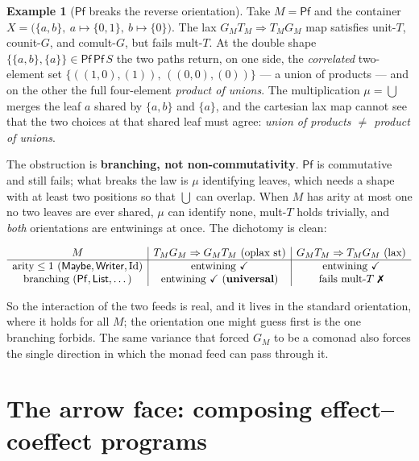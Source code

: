\documentclass[11pt]{amsart}
\theoremstyle{plain}
\theoremstyle{definition}
\newtheorem{example}[theorem]{Example}
\theoremstyle{remark}
\newcommand{\str}{\mathrm{st}}
\newcommand{\Maybe}{\mathsf{Maybe}}
\newcommand{\Pf}{\mathsf{Pf}}
\newcommand{\Writer}{\mathsf{Writer}}
\newcommand{\List}{\mathsf{List}}
\begin{document}
\begin{example}[$\Pf$ breaks the reverse orientation]\label{ex:pf-breaks}
Take $M=\Pf$ and the container $X=\bigl(\{a,b\},\ a\mapsto\{0,1\},\ b\mapsto\{0\}\bigr)$. The
lax $G_M T_M\Rightarrow T_M G_M$ map satisfies unit-$T$, counit-$G$, and comult-$G$, but
fails mult-$T$. At the double shape $\{\{a,b\},\{a\}\}\in\Pf\,\Pf\,S$ the two paths return, on
one side, the \emph{correlated} two-element set $\{((1,0),(1)),\,((0,0),(0))\}$ --- a union of
products --- and on the other the full four-element \emph{product of unions}. The
multiplication $\mu=\bigcup$ merges the leaf $a$ shared by $\{a,b\}$ and $\{a\}$, and the
cartesian lax map cannot see that the two choices at that shared leaf must agree:
\emph{union of products $\neq$ product of unions}.
\end{example}

The obstruction is \textbf{branching, not non-commutativity}. $\Pf$ is commutative and still
fails; what breaks the law is $\mu$ identifying leaves, which needs a shape with at least two
positions so that $\bigcup$ can overlap. When $M$ has arity at most one no two leaves are
ever shared, $\mu$ can identify none, mult-$T$ holds trivially, and \emph{both} orientations
are entwinings at once. The dichotomy is clean:
\begin{center}\small
  \renewcommand{\arraystretch}{1.4}\setlength{\arraycolsep}{4pt}
  $\begin{array}{c|c|c}
    M & T_M G_M\Rightarrow G_M T_M\ (\text{oplax }\str) & G_M T_M\Rightarrow T_M G_M\ (\text{lax})\\\hline
    \text{arity}\le 1\ (\Maybe,\Writer,\mathrm{Id}) & \text{entwining }\checkmark
      & \text{entwining }\checkmark\\
    \text{branching}\ (\Pf,\List,\dots) & \text{entwining }\checkmark\ (\textbf{universal})
      & \text{fails mult-}T\ \text{\ding{55}}
  \end{array}$
\end{center}
So the interaction of the two feeds is real, and it lives in the standard orientation, where
it holds for all $M$; the orientation one might guess first is the one branching forbids. The
same variance that forced $G_M$ to be a comonad also forces the single direction in which the
monad feed can pass through it.

\section{The arrow face: composing effect--coeffect programs}\label{sec:arrow}
\end{document}
